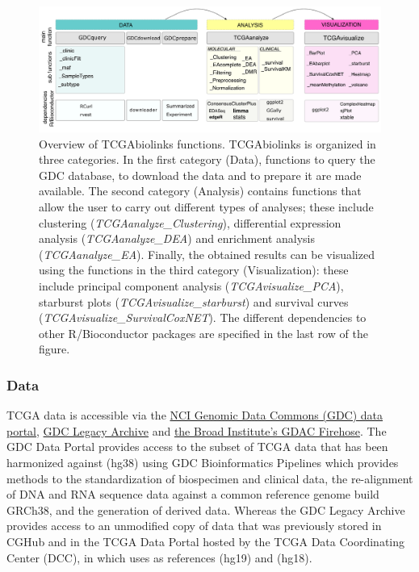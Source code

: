 \begin{figure}
\centering
\includegraphics[width=1.0\linewidth]{images/figure1_new.pdf}
\caption[Overview of TCGAbiolinks functions.]{ Overview of TCGAbiolinks functions. TCGAbiolinks is organized in three categories. In the first category (Data), functions to query the GDC database, to download the data and to prepare it are made available. The second category (Analysis) contains functions that allow the user to carry out different types of analyses; these include clustering (\textit{TCGAanalyze\_Clustering}), differential expression analysis (\textit{TCGAanalyze\_DEA}) and enrichment analysis (\textit{TCGAanalyze\_EA}). Finally, the obtained results can be visualized using the functions in the third category (Visualization): these include principal component analysis (\textit{TCGAvisualize\_PCA}), starburst plots (\textit{TCGAvisualize\_starburst}) and survival curves (\textit{TCGAvisualize\_SurvivalCoxNET}). The different dependencies to other R/Bioconductor packages are specified in the last row of the figure.  }
\label{fig:tcgabiolinksfunctions}
\end{figure}

\subsubsection*{Data}

TCGA data is accessible via the \href{https://gdc-portal.nci.nih.gov/}{NCI Genomic Data Commons (GDC) data portal}, \href{https://gdc-portal.nci.nih.gov/legacy-archive/search/f}{GDC Legacy Archive} and \href{https://github.com/BioinformaticsFMRP/TCGAWorkflow/blob/master/vignettes/gdac.broadinstitute.org}{the Broad Institute’s GDAC Firehose}. The GDC Data Portal provides access to the subset of TCGA data that has been harmonized against  (hg38) using GDC Bioinformatics Pipelines which provides methods to the standardization of biospecimen and clinical data, the re-alignment of DNA and RNA sequence data against a common reference genome build GRCh38, and the generation of derived data. Whereas the GDC Legacy Archive provides access to an unmodified copy of data that was previously stored in CGHub \cite{wilks2014cancer} and in the TCGA Data Portal hosted by the TCGA Data Coordinating Center (DCC), in which uses as references  (hg19) and  (hg18).

